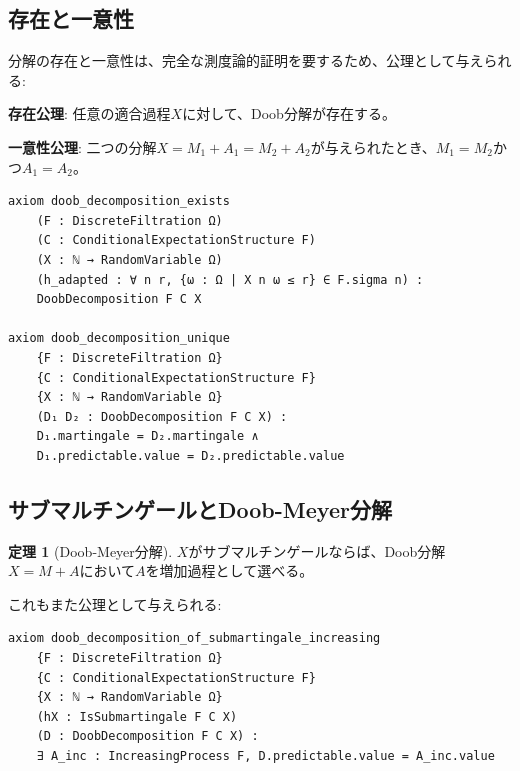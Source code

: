 \documentclass[a4paper,12pt]{ltjsarticle}
\theoremstyle{definition}
\newtheorem{theorem}[definition]{定理}
\begin{document}
\subsection{存在と一意性}

分解の存在と一意性は、完全な測度論的証明を要するため、公理として与えられる:

\begin{axiombox}
\textbf{存在公理}: 任意の適合過程$X$に対して、Doob分解が存在する。

\textbf{一意性公理}: 二つの分解$X = M_1 + A_1 = M_2 + A_2$が与えられたとき、$M_1 = M_2$かつ$A_1 = A_2$。
\end{axiombox}

\begin{leanbox}
\begin{verbatim}
axiom doob_decomposition_exists
    (F : DiscreteFiltration Ω)
    (C : ConditionalExpectationStructure F)
    (X : ℕ → RandomVariable Ω)
    (h_adapted : ∀ n r, {ω : Ω | X n ω ≤ r} ∈ F.sigma n) :
    DoobDecomposition F C X

axiom doob_decomposition_unique
    {F : DiscreteFiltration Ω}
    {C : ConditionalExpectationStructure F}
    {X : ℕ → RandomVariable Ω}
    (D₁ D₂ : DoobDecomposition F C X) :
    D₁.martingale = D₂.martingale ∧
    D₁.predictable.value = D₂.predictable.value
\end{verbatim}
\end{leanbox}

\subsection{サブマルチンゲールとDoob-Meyer分解}

\begin{theorem}[Doob-Meyer分解]
$X$がサブマルチンゲールならば、Doob分解$X = M + A$において$A$を増加過程として選べる。
\end{theorem}

これもまた公理として与えられる:

\begin{leanbox}
\begin{verbatim}
axiom doob_decomposition_of_submartingale_increasing
    {F : DiscreteFiltration Ω}
    {C : ConditionalExpectationStructure F}
    {X : ℕ → RandomVariable Ω}
    (hX : IsSubmartingale F C X)
    (D : DoobDecomposition F C X) :
    ∃ A_inc : IncreasingProcess F, D.predictable.value = A_inc.value
\end{verbatim}
\end{leanbox}
\end{document}
